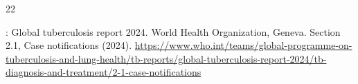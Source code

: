 \documentclass[pdflatex,sn-mathphys-ay,lineno]{sn-jnl}
\begin{document}
\begin{thebibliography}{22}
\begin{botherref}
:
{Global tuberculosis report 2024}.
World Health Organization,
Geneva.
Section 2.1, Case notifications
(2024).
\url{https://www.who.int/teams/global-programme-on-tuberculosis-and-lung-health/tb-reports/global-tuberculosis-report-2024/tb-diagnosis-and-treatment/2-1-case-notifications}
\end{botherref}
\endbibitem

\end{thebibliography}
\end{document}
